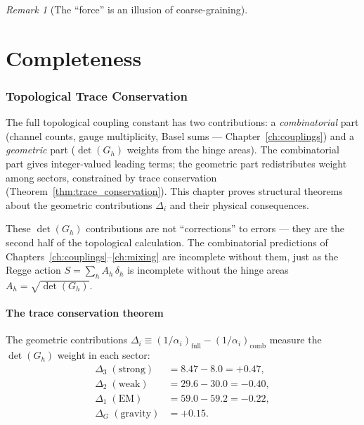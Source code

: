 \documentclass[12pt]{article}
\theoremstyle{remark}
\newtheorem{remark}[theorem]{Remark}
\theoremstyle{definition}
\begin{document}
\begin{remark}[The ``force'' is an illusion of coarse-graining]


\part{Completeness}

\section{Topological Trace Conservation}
\label{ch:ghosts}

The full topological coupling constant has two contributions: a \emph{combinatorial} part (channel counts, gauge multiplicity, Basel sums --- Chapter~\ref{ch:couplings}) and a \emph{geometric} part ($\det(G_h)$ weights from the hinge areas). The combinatorial part gives integer-valued leading terms; the geometric part redistributes weight among sectors, constrained by trace conservation (Theorem~\ref{thm:trace_conservation}). This chapter proves structural theorems about the geometric contributions $\Delta_i$ and their physical consequences.

These $\det(G_h)$ contributions are not ``corrections'' to errors --- they are the second half of the topological calculation. The combinatorial predictions of Chapters~\ref{ch:couplings}--\ref{ch:mixing} are incomplete without them, just as the Regge action $S = \sum_h A_h\,\delta_h$ is incomplete without the hinge areas $A_h = \sqrt{\det(G_h)}$.

\subsection{The trace conservation theorem}

The geometric contributions $\Delta_i \equiv (1/\alpha_i)_\text{full} - (1/\alpha_i)_\text{comb}$ measure the $\det(G_h)$ weight in each sector:
\begin{align}
\Delta_3 \;(\text{strong}) &= 8.47 - 8.0 = +0.47, \\
\Delta_2 \;(\text{weak}) &= 29.6 - 30.0 = -0.40, \\
\Delta_1 \;(\text{EM}) &= 59.0 - 59.2 = -0.22, \\
\Delta_G \;(\text{gravity}) &= +0.15.
\end{align}


\end{remark}
\end{document}
